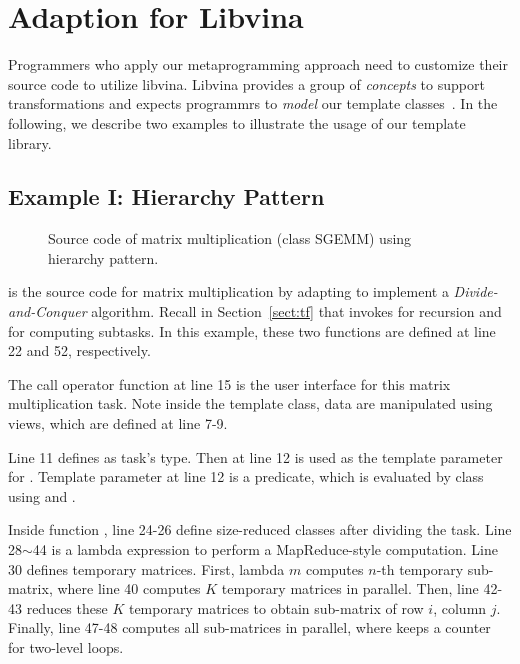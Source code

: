 \section{Adaption for Libvina}
\label{sec:adaption}

Programmers who apply our metaprogramming approach need to customize their
source code to utilize libvina. Libvina provides a group of \emph{concepts}
to support transformations and expects programmrs to \emph{model} our
template classes~\cite{tempmetaprog}. 
In the following, we describe two examples 
to illustrate the usage of our template library. 


\subsection{Example I: Hierarchy Pattern}

\begin{figure}[hbt]
  \caption{Source code of matrix multiplication (class SGEMM) using hierarchy pattern.}
  \label{fig:sgemm}
\end{figure}

 is the source code for matrix multiplication by adapting 
to implement a \emph{Divide-and-Conquer} algorithm. Recall in Section~\ref{sect:tf} that
 invokes  for recursion and 
for computing subtasks. In this example, these two functions are defined at line
22 and 52, respectively.

The call operator function at line 15 is the user interface for this matrix multiplication task.
Note inside the template class, data are manipulated using views, which are defined
at line 7-9.

Line 11 defines  as task's type. Then at line 12  is used as
the template parameter  for . Template parameter  
at line 12 is a predicate, which is evaluated by  class 
using  and .

Inside function , line 24-26 define size-reduced classes after dividing the task. 
Line 28$\sim$44 is a lambda expression to perform a MapReduce-style computation.
Line 30 defines temporary matrices.
First, lambda $m$ computes $n$-th temporary sub-matrix, where line 40 computes
$K$ temporary matrices in parallel. Then, line 42-43 reduces these
$K$ temporary matrices to obtain sub-matrix of row $i$, column $j$. 
Finally, line 47-48 computes all sub-matrices in parallel, where 
keeps a counter for two-level loops.

